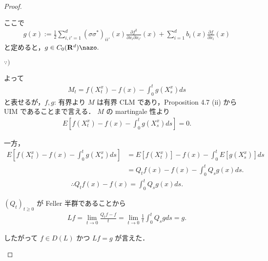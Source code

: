 \documentclass{jsarticle}
\begin{document}
\begin{proof}
\begin{enumerate}[label=(\arabic*)]
        ここで
        \begin{align}
            g(x)
            := \frac{1}{2}\sum_{i, i'=1}^{d}(\sigma\sigma^{\ast})_{ii'}(x)\frac{\partial f^2}{\partial x_{i}\partial x_{i'}}(x)
            + \sum_{i=1}^{d}b_{i}(x)\frac{\partial f}{\partial x_{i}}(x)
        \end{align}
        と定めると，$g\in C_{0}(\mathbf{R}^d)\nazo.$
        
        \begin{screen}
            $\because)$
        \end{screen}

        よって
        \begin{align}
            M_{t}
            = f(X_{t}^{x})
            - f(x)
            - \int_{0}^{t}g(X_{s}^{x})ds
        \end{align}
        と表せるが，$f, g$: 有界より $M$ は有界 CLM であり，Proposition 4.7 (ii) から UIM であることまで言える．
        $M$ の martingale 性より
        \begin{align}
            E[f(X_{t}^{x})
            - f(x)
            - \int_{0}^{t}g(X_{s}^{x})ds]
            = 0.
        \end{align}

        一方，
        \begin{align}
            E[f(X_{t}^{x})
            - f(x)
            - \int_{0}^{t}g(X_{s}^{x})ds]
            &= E[f(X_{t}^{x})]
            - f(x)
            - \int_{0}^{t}E[g(X_{s}^{x})]ds \\
            &= Q_{t}f(x)
            - f(x)
            - \int_{0}^{t}Q_{s}g(x)ds.
        \end{align}
        \begin{align}
            \therefore 
            Q_{t}f(x) - f(x)
            = \int_{0}^{t}Q_{s}g(x)ds.
        \end{align}

        $(Q_{t})_{t\ge0}$ が Feller 半群であることから
        \begin{align}
            Lf
            = \lim_{t\to0}\frac{Q_{t}f - f}{t}
            = \lim_{t\to0}\frac{1}{t}\int_{0}^{t}Q_{s}gds
            = g.
        \end{align}

        したがって $f\in D(L)$ かつ $Lf=g$ が言えた．
    \end{enumerate}
\end{proof}
\end{document}
